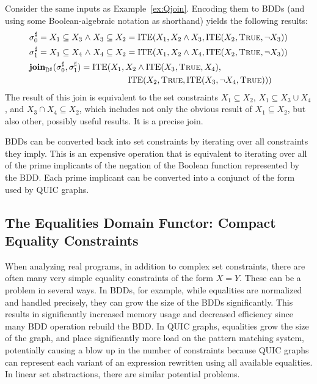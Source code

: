 \begin{example}  Consider the same inputs as Example~\ref{ex:Qjoin}.  Encoding them to BDDs (and using some Boolean-algebraic notation as shorthand) yields the following results:
\begin{align*}
  & {\sigma}^{\sharp}_0 = X_1 \subseteq X_3 \mathrel{\wedge} X_3 \subseteq X_2 = \textrm{ITE}(X_1, X_2 \wedge X_3, \textrm{ITE}(X_2, \textsc{True}, \neg X_3)) \\
  & {\sigma}^{\sharp}_1 = X_1 \subseteq X_4 \mathrel{\wedge} X_4 \subseteq X_2 = \textrm{ITE}(X_1, X_2 \wedge X_4, \textrm{ITE}(X_2, \textsc{True}, \neg X_3)) \\
  & \textbf{join}_{{\mathbb{D}}^{\sharp}}({\sigma}^{\sharp}_0, {\sigma}^{\sharp}_1 ) = \textrm{ITE}(X_1, X_2 \wedge \textrm{ITE}(X_3, \textsc{True}, X_4), \\
  & \qquad \qquad \qquad \qquad \qquad \quad \;\; \textrm{ITE}(X_2, \textsc{True}, \textrm{ITE}(X_3, \neg X_4, \textsc{True})))
\end{align*}
  The result of this join is equivalent to the set constraints $X_1 \subseteq X_2$, $X_1 \subseteq X_3 \cup X_4$, and $X_3 \cap X_4 \subseteq X_2$, which includes not only the obvious result of $X_1 \subseteq X_2$, but also other, possibly useful results.  It is a precise join.
\end{example}

BDDs can be converted back into set constraints by iterating over all constraints they imply.  This is an expensive operation that is equivalent to iterating over all of the prime implicants of the negation of the Boolean function represented by the BDD.  Each prime implicant can be converted into a conjunct of the form used by QUIC graphs.

\subsection{The Equalities Domain Functor: Compact Equality Constraints}
\label{s:4:4:eqs}
\newcommand{\eqrep}{\ensuremath{Q}}

When analyzing real programs, in addition to complex set constraints, there are often many very simple equality constraints of the form $X = Y$.  These can be a problem in several ways.  In BDDs, for example, while equalities are normalized and handled precisely, they can grow the size of the BDDs significantly.  This results in significantly increased memory usage and decreased efficiency since many BDD operation rebuild the BDD.  In QUIC graphs, equalities grow the size of the graph, and place significantly more load on the pattern matching system, potentially causing a blow up in the number of constraints because QUIC graphs can represent each variant of an expression rewritten using all available equalities.  In linear set abstractions, there are similar potential problems.

